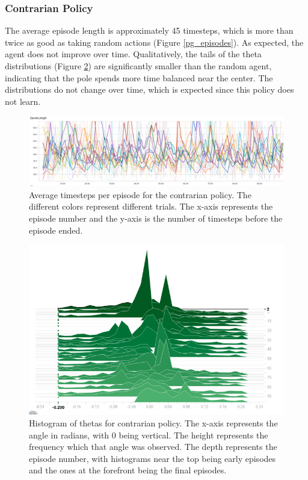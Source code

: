 \documentclass[12pt,a4paper]{article}
\begin{document}
\subsubsection*{Contrarian Policy}

The average episode length is approximately 45 timesteps, which is more than twice as good as taking random actions (Figure \ref{pg_episodes}). As expected, the agent does not improve over time.  Qualitatively, the tails of the theta distributions (Figure \ref{contrarian_thetas}) are significantly smaller than the random agent, indicating that the pole spends more time balanced near the center. The distributions do not change over time, which is expected since this policy does not learn. 

\begin{figure}[htbp]
\begin{center}
\includegraphics[width=\linewidth]{contrarian_lengths.png}
\caption{Average timesteps per episode for the contrarian policy. The different colors represent different trials. The x-axis represents the episode number and the y-axis is the number of timesteps before the episode ended. }
\label{contrarian_lengths}
\end{center}
\end{figure}

\begin{figure}[htbp]
\begin{center}
\includegraphics[width=\linewidth]{contrarian_thetas.png}
\caption{Histogram of thetas for contrarian policy. The x-axis represents the angle in radians, with 0 being vertical. The height represents the frequency which that angle was observed. The depth represents the episode number, with histograms near the top being early episodes and the ones at the forefront being the final episodes.}
\label{contrarian_thetas}
\end{center}
\end{figure}
\end{document}
